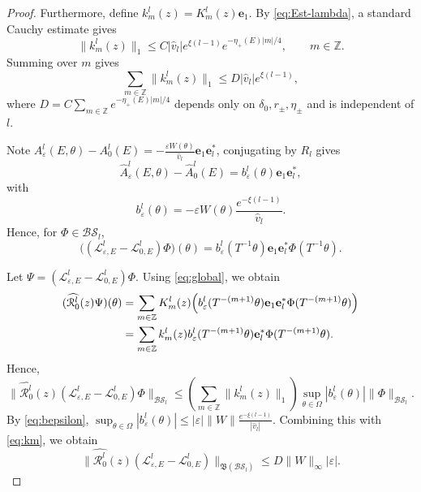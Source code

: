 \documentclass[reqno,11pt]{amsart}
\begin{document}
\begin{proof}
Furthermore, define $k_m^{l}(z)=K_m^{l}(z)\mathbf e_{1}$. By \eqref{eq:Est-lambda},
a standard Cauchy estimate gives
$$
\|k_m^{l}(z)\|_{1} \le C |\hat{v}_l| e^{\xi(l-1)} e^{-\eta_+(E)|m|/4}, \qquad m\in\mathbb Z.
$$
Summing over $m$ gives
\begin{equation}
\label{eq:km}
\sum_{m\in\mathbb Z}\|k_m^{l}(z)\|_{1}
\le D |\hat{v}_l| e^{\xi(l-1)},
\end{equation}
where $D = C\sum_{m\in\mathbb Z}e^{-\eta_+(E)|m|/4}$ depends only on $\delta_0, r_\pm,\eta_\pm$ and is independent of $l$.

Note $A_{\varepsilon}^{l}(E,\theta)-A_{0}^{l}(E) = -\frac{\varepsilon W(\theta)}{\hat{v}_l} \mathbf e_{1}\mathbf e_l^\ast$, conjugating by $R_l$ gives
$$
\widehat A_{\varepsilon}^{l}(E,\theta)-\widehat A_{0}^{l}(E) = b^{l}_{\varepsilon}(\theta)\mathbf e_{1}\mathbf e_l^\ast,
$$
with
\begin{equation}
\label{eq:bepsilon}
b^{l}_{\varepsilon}(\theta) = -\varepsilon W(\theta)\frac{e^{-\xi(l-1)}}{\hat{v}_l}.
\end{equation}
Hence, for $\Phi\in\mathcal{BS}_l$,
\begin{equation}
\label{eq:global}
\bigl((\mathcal{L}^{l}_{\varepsilon,E}-\mathcal{L}^{l}_{0,E})\Phi\bigr)(\theta)
= b^{l}_{\varepsilon}(T^{-1}\theta) \mathbf e_{1} \mathbf e_l^\ast\Phi(T^{-1}\theta).
\end{equation}


Let
$
\Psi=(\mathcal{L}^{l}_{\varepsilon,E}-\mathcal{L}^{l}_{0,E})\Phi.
$
Using \eqref{eq:global}, we obtain
\begin{align*}
(\widehat{\mathcal{R}^{l}_{0}}(z)\Psi)(\theta)
&=\sum_{m\in\mathbb Z}
K_m^{l}(z)
\Bigl(b^{l}_{\varepsilon}(T^{-(m+1)}\theta)\mathbf e_{1}
\mathbf e_l^\ast \Phi(T^{-(m+1)}\theta)\Bigr)\\
&=\sum_{m\in\mathbb Z}
k_m^{l}(z)
b^{l}_{\varepsilon}(T^{-(m+1)}\theta)
\mathbf e_l^\ast \Phi(T^{-(m+1)}\theta).
\end{align*}
Hence,
\begin{equation*}
\|\widehat{\mathcal{R}^{l}_{0}}(z)(\mathcal{L}^{l}_{\varepsilon,E}-\mathcal{L}^{l}_{0,E})\Phi\|_{\mathcal{BS}_l}
\le\left(\sum_{m\in\mathbb Z}\|k_m^{l}(z)\|_{1}\right)
\sup_{\theta\in\Omega}|b^{l}_{\varepsilon}(\theta)|
\|\Phi\|_{\mathcal{BS}_l}.
\end{equation*}
By \eqref{eq:bepsilon},
$
\sup_{\theta\in\Omega}|b^{l}_{\varepsilon}(\theta)|
\le|\varepsilon|\|W\|
\frac{e^{-\xi(l-1)}}{|\hat{v}_l|}.
$
Combining this with \eqref{eq:km}, we obtain
\begin{equation*}
\|\widehat{\mathcal{R}^{l}_{0}}(z)(\mathcal{L}^{l}_{\varepsilon,E}-\mathcal{L}^{l}_{0,E})\|_{\mathfrak{B}(\mathcal{BS}_l )}
\le D\|W\|_\infty|\varepsilon|.
\end{equation*}


\end{proof}
\end{document}

